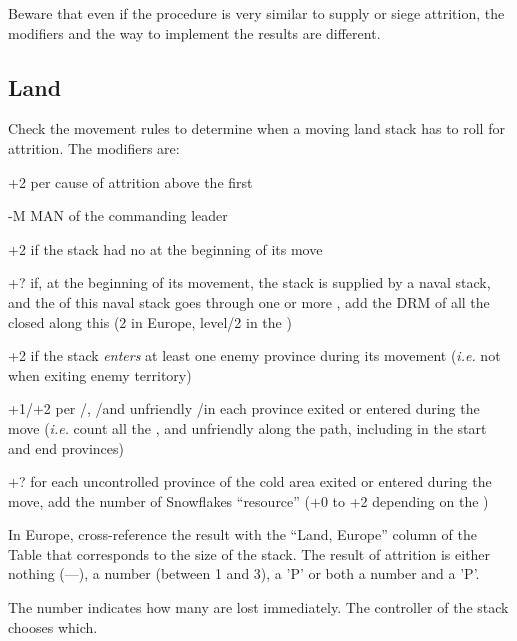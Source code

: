 Beware that even if the procedure is very similar to supply or siege
attrition, the modifiers and the way to implement the results are different.

\subsection{Land}
Check the movement rules to determine when a moving land stack has to roll for
attrition. The modifiers are:
\begin{modlist}
\item[+2] per cause of attrition above the first
\item[-M] MAN of the commanding leader
\item[+2] if the stack had no \LoS at the beginning of its move
\item[+?] if, at the beginning of its movement, the stack is supplied by a
  naval stack, and the \LoS of this naval stack goes through one or more
  \StraitFort, add the DRM of all the closed \StraitFort along this \LoS (2 in
  Europe, level/2 in the \ROTW)
\item[+2] if the stack \emph{enters} at least one enemy province during its
  movement (\emph{i.e.}  not when exiting enemy territory)
\item[+1/+2] per \PILLAGE\Facemoins/\Faceplus, \REVOLT\Facemoins/\Faceplus and
  unfriendly \REBELLION\Facemoins/\Faceplus in each province exited or entered
  during the move (\emph{i.e.} count all the \PILLAGE, \REVOLT and unfriendly
  \REBELLION along the path, including in the start and end provinces)
\item[+?] for each uncontrolled province of the \ROTW cold area exited or
  entered during the move, add the number of Snowflakes ``resource'' (+0 to +2
  depending on the \Area)
\end{modlist}

In Europe, cross-reference the result with the ``Land, Europe'' column of the
Table that corresponds to the size of the stack. The result of attrition is
either nothing (---), a number (between 1 and 3), a 'P' or both a number and a
'P'.

The number indicates how many \LD are lost immediately. The controller of the
stack chooses which.

